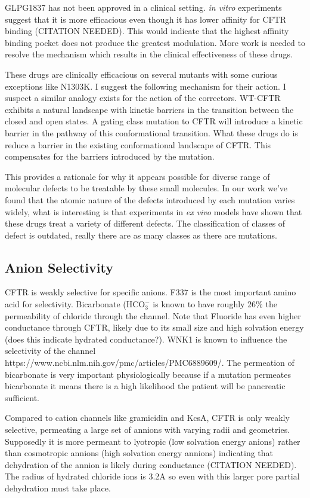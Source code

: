 GLPG1837 has not been approved in a clinical setting. \textit {in vitro} experiments suggest that it is more efficacious even though it has lower affinity for CFTR binding (CITATION NEEDED). This would indicate that the highest affinity binding pocket does not produce the greatest modulation. More work is needed to resolve the mechanism which results in the clinical effectiveness of these drugs.  

These drugs are clinically efficacious \cite{VanGoor2014} on several mutants with some curious exceptions like N1303K. I suggest the following mechanism for their action. I suspect a similar analogy exists for the action of the correctors. WT-CFTR exhibits a natural landscape with kinetic barriers in the transition between the closed and open states. A gating class mutation to CFTR will introduce a kinetic barrier in the pathway of this conformational transition. What these drugs do is reduce a barrier in the existing conformational landscape of CFTR. This compensates for the barriers introduced by the mutation. 

This provides a rationale for why it appears possible for diverse range of molecular defects to be treatable by these small molecules. In our work we've found that the atomic nature of the defects introduced by each mutation varies widely, what is interesting is that experiments in \textit{ex vivo} models have shown that these drugs treat a variety of different defects. The classification of classes of defect is outdated, really there are as many classes as there are mutations.


\subsection {Anion Selectivity}
CFTR is weakly selective for specific anions. F337 is the most important amino acid for selectivity. Bicarbonate (HCO$_3^-$ is known to have roughly 26\% the permeability of chloride through the channel. Note that Fluoride has even higher conductance through CFTR, likely due to its small size and high solvation energy (does this indicate hydrated conductance?). WNK1 is known to influence the selectivity of the channel https://www.ncbi.nlm.nih.gov/pmc/articles/PMC6889609/. The permeation of bicarbonate is very important physiologically because if a mutation permeates bicarbonate it means there is a high likelihood the patient will be pancreatic sufficient. 

Compared to cation channels like gramicidin and KcsA, CFTR is only weakly selective, permeating a large set of annions with varying radii and geometries. Supposedly it is more permeant to lyotropic (low solvation energy anions) rather than cosmotropic annions (high solvation energy annions) indicating that dehydration of the annion is likely during conductance (CITATION NEEDED). The radius of hydrated chloride ions is 3.2A\cite{yang2002} so even with this larger pore partial dehydration must take place. 

